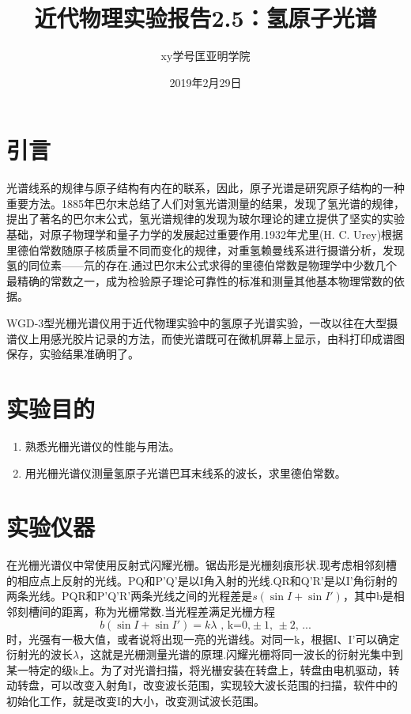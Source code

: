 \documentclass[a4paper]{article}
\title{近代物理实验报告2.5：氢原子光谱}
\author{xy\quad 学号\quad 匡亚明学院}
\date{2019年2月29日}
\begin{document}
\maketitle


\section{引言}
光谱线系的规律与原子结构有内在的联系，因此，原子光谱是研究原子结构的一种重要方法。1885年巴尔末总结了人们对氢光谱测量的结果，发现了氢光谱的规律，提出了著名的巴尔末公式，氢光谱规律的发现为玻尔理论的建立提供了坚实的实验基础，对原子物理学和量子力学的发展起过重要作用.1932年尤里(H. C. Urey)根据里德伯常数随原子核质量不同而变化的规律，对重氢赖曼线系进行摄谱分析，发现氢的同位素——氘的存在.通过巴尔末公式求得的里德伯常数是物理学中少数几个最精确的常数之一，成为检验原子理论可靠性的标准和测量其他基本物理常数的依据。

WGD-3型光栅光谱仪用于近代物理实验中的氢原子光谱实验，一改以往在大型摄谱仪上用感光胶片记录的方法，而使光谱既可在微机屏幕上显示，由科打印成谱图保存，实验结果准确明了。

\section{实验目的}
\begin{enumerate}
\item 熟悉光栅光谱仪的性能与用法。
\item 用光栅光谱仪测量氢原子光谱巴耳末线系的波长，求里德伯常数。
\end{enumerate}

\section{实验仪器}
在光栅光谱仪中常使用反射式闪耀光栅。锯齿形是光栅刻痕形状.现考虑相邻刻槽的相应点上反射的光线。PQ和P'Q'是以I角入射的光线.QR和Q'R'是以I'角衍射的两条光线。PQR和P'Q'R'两条光线之间的光程差是$s(\sin I+\sin I')$，其中b是相邻刻槽间的距离，称为光栅常数.当光程差满足光栅方程
\begin{equation}
b(\sin I+\sin I') = k\lambda\text{ , k=0,}\pm\text{1, }\pm\text{2, ...}
\end{equation}
时，光强有一极大值，或者说将出现一亮的光谱线。对同一k，根据I、I'可以确定衍射光的波长$\lambda$，这就是光栅测量光谱的原理.闪耀光栅将同一波长的衍射光集中到某一特定的级k上。为了对光谱扫描，将光栅安装在转盘上，转盘由电机驱动，转动转盘，可以改变入射角I，改变波长范围，实现较大波长范围的扫描，软件中的初始化工作，就是改变I的大小，改变测试波长范围。
\end{document}

